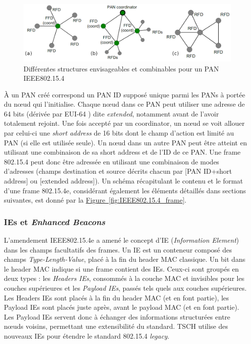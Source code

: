 \documentclass[]{report}
\newcommand{\wordlink}[2]{\hyperref[#2]{#1~\ref{#2}}}
\begin{document}
\vspace{0.4cm}

	\begin{figure}[!ht]
	\centering
	\includegraphics[width=0.9\linewidth]{PANs}
	\caption{Différentes structures envisageables et combinables pour un PAN IEEE802.15.4}
	\label{fig:PANs}
	\end{figure}

\vspace{0.2cm}

\par À un PAN créé correspond un PAN ID supposé unique parmi les PANs à portée du nœud qui l'initialise. Chaque nœud dans ce PAN peut utiliser une adresse de 64 bits (dérivée par EUI-64 \cite{IEEE802.15.4}) dite \textit{extended}, notamment avant de l'avoir totalement rejoint. Une fois accepté par un coordinator, un nœud se voit allouer par celui-ci une \textit{short address} de 16 bits dont le champ d'action est limité au PAN (si elle est utilisée seule). Un nœud dans un autre PAN peut être atteint en utilisant une combinaison de sa short address et de l'ID de ce PAN. Une frame 802.15.4 peut donc être adressée en utilisant une combinaison de modes d'adresses (champs destination et source décrits chacun par [PAN ID+short address] ou [extended address]). Un schéma récapitulant le contenu et le format d'une frame 802.15.4e, considérant également les éléments détaillés dans sections suivantes, est donné par la \wordlink{Figure}{fig:IEEE802.15.4_frame}.

\newpage

\subsubsection{IEs et \textit{Enhanced Beacons}}
\label{EBs}

L'amendement IEEE802.15.4e a amené le concept d'IE (\textit{Information Element}) dans les champs facultatifs des frames. Un IE est un conteneur composé des champs \textit{Type-Length-Value}, placé à la fin du header MAC classique. Un bit dans le header MAC indique si une frame contient des IEs. Ceux-ci sont groupés en deux types : les \textit{Headers IEs}, consommés à la couche MAC et invisibles pour les couches supérieures et les \textit{Payload IEs}, passés tels quels aux couches supérieures. Les Headers IEs sont placés à la fin du header MAC (et en font partie), les Payload IEs sont placés juste après, avant le payload MAC (et en font partie). Les Payload IEs servent donc à échanger des informations structurées entre nœuds voisins, permettant une extensibilité du standard. TSCH utilise des nouveaux IEs pour étendre le standard 802.15.4 \textit{legacy}.\\
\end{document}
